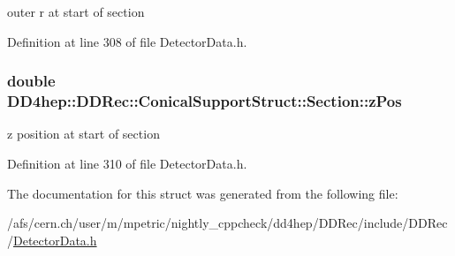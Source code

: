 outer r at start of section 

Definition at line 308 of file DetectorData.h.\hypertarget{struct_d_d4hep_1_1_d_d_rec_1_1_conical_support_struct_1_1_section_a078b08f486bacca5f6de87ac1bba2b97}{
\subsubsection[{zPos}]{\setlength{\rightskip}{0pt plus 5cm}double {\bf DD4hep::DDRec::ConicalSupportStruct::Section::zPos}}}
\label{struct_d_d4hep_1_1_d_d_rec_1_1_conical_support_struct_1_1_section_a078b08f486bacca5f6de87ac1bba2b97}


z position at start of section 

Definition at line 310 of file DetectorData.h.

The documentation for this struct was generated from the following file:\begin{DoxyCompactItemize}
\item 
/afs/cern.ch/user/m/mpetric/nightly\_\-cppcheck/dd4hep/DDRec/include/DDRec/\hyperlink{_detector_data_8h}{DetectorData.h}\end{DoxyCompactItemize}
